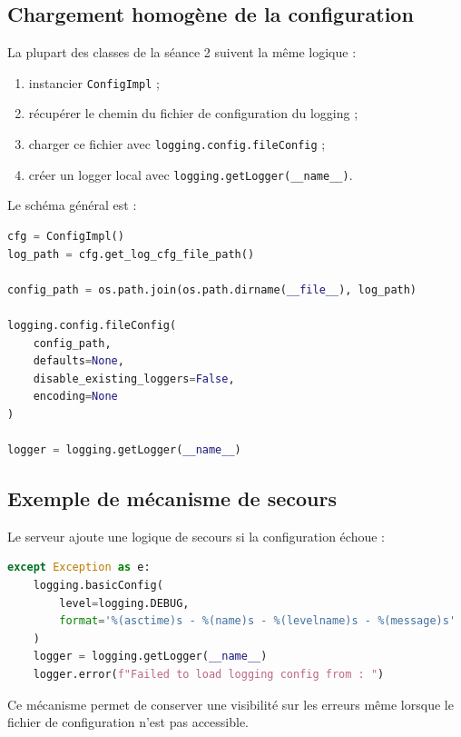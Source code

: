 \documentclass{article}
\begin{document}
\subsection{Chargement homogène de la configuration}

La plupart des classes de la séance 2 suivent la même logique :
\begin{enumerate}[leftmargin=*]
    \item instancier \texttt{ConfigImpl} ;
    \item récupérer le chemin du fichier de configuration du logging ;
    \item charger ce fichier avec \texttt{logging.config.fileConfig} ;
    \item créer un logger local avec \texttt{logging.getLogger(\_\_name\_\_)}.
\end{enumerate}

Le schéma général est :

\begin{lstlisting}[language=Python, caption=Schéma général de configuration du logging]
cfg = ConfigImpl()
log_path = cfg.get_log_cfg_file_path()

config_path = os.path.join(os.path.dirname(__file__), log_path)

logging.config.fileConfig(
    config_path,
    defaults=None,
    disable_existing_loggers=False,
    encoding=None
)

logger = logging.getLogger(__name__)
\end{lstlisting}

\subsection{Exemple de mécanisme de secours}

Le serveur ajoute une logique de secours si la configuration échoue :

\begin{lstlisting}[language=Python, caption=Fallback logging dans ServerImpl.py]
except Exception as e:
    logging.basicConfig(
        level=logging.DEBUG,
        format='%(asctime)s - %(name)s - %(levelname)s - %(message)s'
    )
    logger = logging.getLogger(__name__)
    logger.error(f"Failed to load logging config from : ")
\end{lstlisting}

Ce mécanisme permet de conserver une visibilité sur les erreurs même lorsque le fichier de configuration n’est pas accessible.
\end{document}
